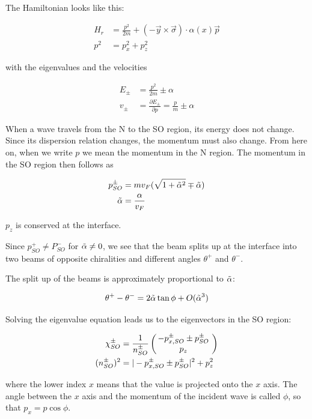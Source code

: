The Hamiltonian looks like this:

\begin{align}
    H_r &= \frac{p^2}{2m} + (-\vec y \times \vec \sigma) \cdot
            \alpha(x) \vec p\\ 
    p^2 &= p_x^2 + p_z^2
\end{align}

with the eigenvalues and the velocities

\begin{align}
    E_{\pm} &= \frac{p^2}{2m} \pm \alpha \\
    v_{\pm} &= \frac{\partial E_{\pm}}{\partial p} = \frac{p}{m} \pm \alpha
\end{align}

When a wave travels from the N to the SO region, its energy does not
change. Since its dispersion relation changes, the momentum must also
change. From here on, when we write $p$ we mean the momentum in the N
region. The momentum in the SO region then follows as

\begin{align}
    \label{eq:pso}
    p_{SO}^{\pm} &= m v_F (\sqrt{1 + \tilde \alpha^2} \mp \tilde \alpha) \\
    \tilde\alpha &= \frac{\alpha}{v_F}
\end{align}

$p_z$ is conserved at the interface.

Since $p_{SO}^+ \not = P_{SO}^-$ for $\tilde \alpha \not = 0$, we see that
the beam splits up at the interface into two beams of opposite
chiralities and different angles $\theta^+$ and $\theta^-$.

The split up of the beams is approximately proportional to $\tilde \alpha$:

\begin{align}
    \theta^+ - \theta^- = 2 \tilde \alpha \tan \phi + O(\tilde \alpha^3)
\end{align}

Solving the eigenvalue equation leads us to the eigenvectors in the SO
region:

\begin{align}
   \chi_{SO}^{\pm} &= \frac{1}{n_{SO}^{\pm}} 
                      \left(\hspace{-.8ex}\begin{array}{c}-p_{x,SO}^{\pm} \pm p_{SO}^\pm\\p_z\end{array}\hspace{-.4ex}\right) \\
    (n_{SO}^{\pm})^2 &= |-p_{x,SO}^{\pm} \pm p_{SO}^\pm|^2 + p_z^2
    \label{eq:chi-so-pm}
\end{align}

where the lower index $x$ means that the value is projected onto the
$x$ axis. The angle between the $x$ axis and the momentum of the
incident wave is called $\phi$, so that $p_x = p \cos \phi$.

